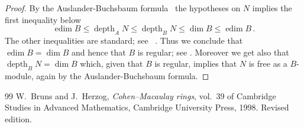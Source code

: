 \documentclass[10pt,a4paper]{amsart}
\newcommand{\depth}{\operatorname{depth}}
\newcommand{\edim}{\operatorname{edim}}
\begin{document}
\begin{proof}
By the Auslander-Buchsbaum formula~\cite[Theorem~1.3.3]{Bruns/Herzog:1998a} the hypotheses on $N$ implies the first inequality below
\[
\edim B \le \depth_A N \le \depth_B N \le \dim B\le\edim B\,.
\]
The other inequalities are standard; see ~\cite[\S1.2]{Bruns/Herzog:1998a}. Thus we conclude that $\edim B=\dim B$ and hence that $B$ is regular; see \cite[\S2.2]{Bruns/Herzog:1998a}. Moreover we get also that $\depth_BN=\dim B$ which, given that $B$ is regular, implies that $N$ is free as a $B$-module, again by the Auslander-Buchsbaum formula.
\end{proof}

\begin{thebibliography}{99}
 {\sc W.~Bruns and J.~Herzog}, {\em {Cohen--Macaulay rings}}, vol.~39 of Cambridge Studies in Advanced Mathematics, Cambridge University Press, 1998. \newblock Revised edition.
\end{thebibliography}
\end{document}
